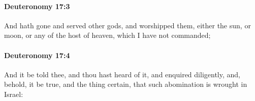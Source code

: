 		\paragraph{Deuteronomy 17:3} %
			\label{DEUTERONOMY-17-3}

			And hath gone and served other gods, and worshipped them, either the sun, or moon, or any of the host of heaven, which I have not commanded;


		\paragraph{Deuteronomy 17:4} %
			\label{DEUTERONOMY-17-4}

			And it be told thee, and thou hast heard of it, and enquired diligently, and, behold, it be true, and the thing certain, that such abomination is wrought in Israel:


